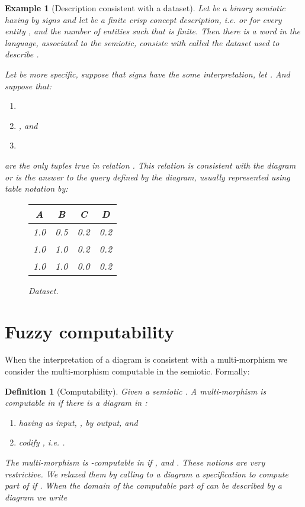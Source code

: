 \documentclass[oribibl]{llncs}
\newtheorem{defn}{Definition}
\newtheorem{exam}{Example}
\begin{document}
\begin{exam}[Description consistent with a dataset]
Let  be a binary semiotic having by signs  and let  be a finite crisp concept description, i.e.  or  for every entity , and the number of entities  such that  is finite. Then there is a word  in the language, associated to the semiotic, consiste with  called the dataset used to describe .

Let be more specific, suppose that signs  have the some interpretation, let . And suppose that:
\begin{enumerate}
  \item 
  \item , and
  \item 
\end{enumerate}
 are the only tuples true in relation . This relation is consistent with the diagram
or  is the answer to the query defined by the diagram,
usually represented using table notation by:
\begin{figure}[h]
\begin{center}
\begin{tabular}{|c|c|c|c|}
  \hline
  A & B & C & D \\
  \hline
  1.0 & 0.5 & 0.2 & 0.2 \\
  1.0 & 1.0 & 0.2 & 0.2 \\
  1.0 & 1.0 & 0.0 & 0.2 \\
  \hline
\end{tabular}
\end{center}
\caption{Dataset.}\label{dataset}
\end{figure}
\end{exam}

\section{Fuzzy computability}\label{fuzzy computability}
When the interpretation of a diagram is consistent with a multi-morphism we consider the multi-morphism computable in the semiotic. Formally:
\begin{defn}[Computability]
Given a semiotic . A multi-morphism  is computable in  if there is a diagram  in :
\begin{enumerate}
  \item having  as input, ,  by output, and
  \item codify , i.e. .
\end{enumerate}
The multi-morphism  is -computable in  if ,  and  . These notions are very restrictive. We  relaxed them by calling to a diagram  a specification to compute part of  if
. When the domain of the computable part of  can be described by a diagram  we write 
\end{defn}
\end{document}

